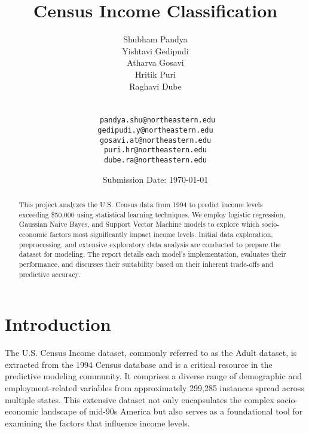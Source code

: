 \documentclass[12pt]{article}
\begin{document}
\title{\textbf{Census Income Classification}}
\author{
    Shubham Pandya\\
    Yishtavi Gedipudi\\
    Atharva Gosavi\\
    Hritik Puri \\
    Raghavi Dube\\
    \\\\
    \texttt{
    pandya.shu@northeastern.edu\\
    gedipudi.y@northeastern.edu\\
    gosavi.at@northeastern.edu\\
    puri.hr@northeastern.edu\\
    dube.ra@northeastern.edu\\}
}
\date{Submission Date: \today}
\maketitle
\newpage

\begin{abstract}
This project analyzes the U.S. Census data from 1994 to predict income levels exceeding \$50,000 using statistical learning techniques. We employ logistic regression, Gaussian Naive Bayes, and Support Vector Machine models to explore which socio-economic factors most significantly impact income levels. Initial data exploration, preprocessing, and extensive exploratory data analysis are conducted to prepare the dataset for modeling. The report details each model's implementation, evaluates their performance, and discusses their suitability based on their inherent trade-offs and predictive accuracy.
\end{abstract}


\newpage

\tableofcontents
\newpage

\section{Introduction}
The U.S. Census Income dataset, commonly referred to as the Adult dataset, is extracted from the 1994 Census database and is a critical resource in the predictive modeling community. It comprises a diverse range of demographic and employment-related variables from approximately 299,285 instances spread across multiple states. This extensive dataset not only encapsulates the complex socio-economic landscape of mid-90s America but also serves as a foundational tool for examining the factors that influence income levels.
\end{document}
